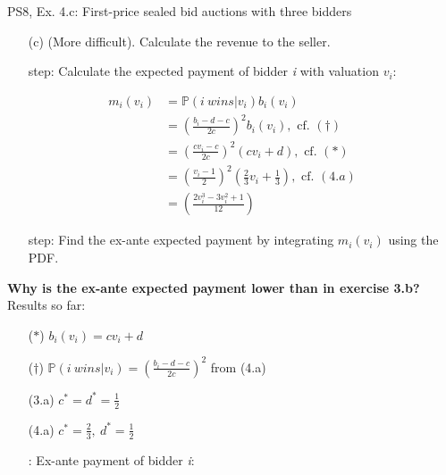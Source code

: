 \begin{frame}{PS8, Ex. 4.c: First-price sealed bid auctions with three bidders}
    \begin{itemize}
      \item[(c)] (More difficult). Calculate the revenue to the seller.
    \end{itemize}
    \vspace{-8pt}
    \begin{multicols}{2}
      \begin{itemize}
        \item[\nth{1} step:] Calculate the expected payment of bidder \textit{i} with valuation $v_i$:
      \end{itemize}
      \vspace{-10pt}
      \begin{align*}
        m_i(v_i)&=\mathbb{P}(i\ wins|v_i)b_i(v_i)\\
                &=\left(\frac{b_i-d-c}{2c}\right)^2b_i(v_i),\text{ cf. }(\dagger)\\
                &=\left(\frac{cv_i-c}{2c}\right)^2(cv_i+d),\text{ cf. }(*)\\
                &=\left(\frac{v_i-1}{2}\right)^2\left(\frac{2}{3}v_i+\frac{1}{3}\right),\text{ cf. }(4.a)\\
                &=\left(\frac{2v_i^3-3v_i^2+1}{12}\right)
      \end{align*}
      \vspace{-10pt}
      \begin{itemize}
        \item[\nth{2} step:] Find the ex-ante expected payment by integrating $m_i(v_i)$ using the PDF.
      \end{itemize}
      \vspace{-4pt}
      \textbf{Why is the ex-ante expected payment lower than in exercise 3.b?}
      \vfill\null\columnbreak
      Results so far:
      \vspace{-6pt}
      \begin{itemize}
        \item[($*$)] $b_i(v_i) = cv_i+d$
        \item[($\dagger$)] $\mathbb{P}(i\ wins|v_i)=\left(\frac{b_i-d-c}{2c}\right)^2$ from (4.a)
        \item[(3.a)] $c^*=d^*=\frac{1}{2}$
        \item[(4.a)] $c^*=\frac{2}{3},\ d^*=\frac{1}{2}$
        \item[\nth{2}:] Ex-ante payment of bidder \textit{i}:
      \end{itemize}

\end{multicols}
\end{frame}
